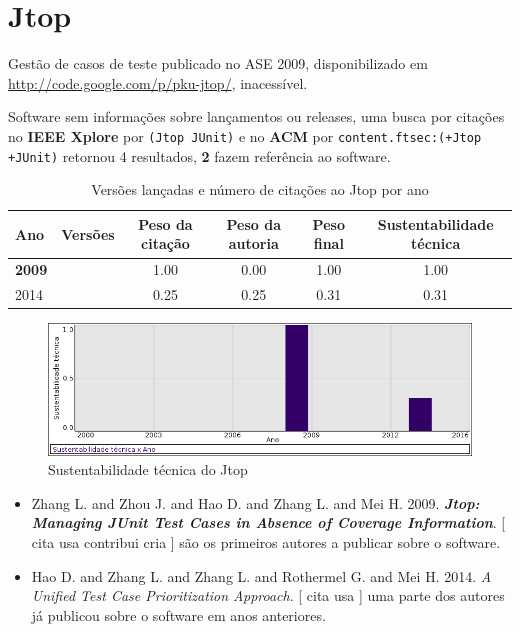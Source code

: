 \section{Jtop}

Gestão de casos de teste
publicado no ASE 2009,
disponibilizado em \url{http://code.google.com/p/pku-jtop/},
inacessível.

Software sem informações sobre lançamentos ou releases,
uma busca por citações no {\bf IEEE Xplore} por
\texttt{(Jtop JUnit)}
e no {\bf ACM} por
\texttt{content.ftsec:(+Jtop +JUnit)}
retornou
4 resultados,
{\bf 2} fazem referência ao software.


\begin{table}[H]
\caption{Versões lançadas e número de citações ao Jtop por ano}
\centering
\begin{tabular}{| l | c | c | c | c | c |}
  \hline
  Ano & Versões & Peso da citação & Peso da autoria & Peso final & Sustentabilidade técnica \\
  \hline
            {\bf 2009}
          &
          
          &
          1.00
          &
          0.00
          &
          1.00
          &
            {\color{blue} 1.00}
          \\
\hline
            2014
          &
          
          &
          0.25
          &
          0.25
          &
          0.31
          &
            {\color{red} 0.31}
          \\
\hline
\end{tabular}
\end{table}

\begin{figure}[h]
  \center
  \includegraphics[scale=0.50]{imagens/softwares-charts/jtop.png}
  \caption{Sustentabilidade técnica do Jtop}
\end{figure}


\begin{itemize}
\item Zhang L. and Zhou J. and Hao D. and Zhang L. and Mei H.
      2009.
        \textbf{\textit{ Jtop: Managing JUnit Test Cases in Absence of Coverage Information}}.
      [
          cita
          usa
          contribui
          cria
      ]
são os primeiros autores a publicar sobre o software.
\item Hao D. and Zhang L. and Zhang L. and Rothermel G. and Mei H.
      2014.
        \textit{ A Unified Test Case Prioritization Approach}.
      [
          cita
          usa
      ]
uma parte dos autores já publicou sobre o software em anos anteriores.
\end{itemize}

